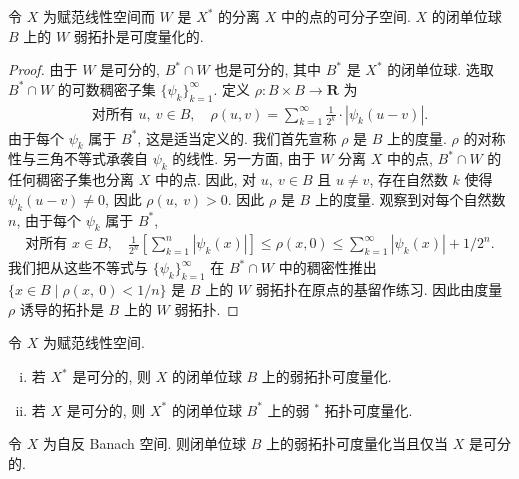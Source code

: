 \documentclass[../../main.tex]{subfiles}
\begin{document}
\begin{theorem}\label{theorem:ch15-W-metrizable}
令 $X$ 为赋范线性空间而 $W$ 是 $X^{*}$ 的分离 $X$ 中的点的可分子空间. $X$ 的闭单位球 $B$ 上的 $W$ 弱拓扑是可度量化的.
\end{theorem}

\begin{proof}
由于 $W$ 是可分的, $B^{*}\cap W$ 也是可分的, 其中 $B^{*}$ 是 $X^{*}$ 的闭单位球. 选取 $B^{*}\cap W$ 的可数稠密子集 $\{\psi_{k}\}_{k=1}^{\infty}$. 定义 $\rho:B\times B\to\mathbf{R}$ 为
\begin{align*}
\text{对所有 }u,\ v\in B,\quad\rho(u,v)=\sum_{k=1}^{\infty}\frac{1}{2^{k}}\cdot\left|\psi_{k}(u-v)\right|.
\end{align*}
由于每个 $\psi_{k}$ 属于 $B^{*}$, 这是适当定义的. 我们首先宣称 $\rho$ 是 $B$ 上的度量. $\rho$ 的对称性与三角不等式承袭自 $\psi_{k}$ 的线性. 另一方面, 由于 $W$ 分离 $X$ 中的点, $B^{*}\cap W$ 的任何稠密子集也分离 $X$ 中的点. 因此, 对 $u,\ v\in B$ 且 $u\neq v$, 存在自然数 $k$ 使得 $\psi_{k}(u-v)\neq 0$, 因此 $\rho(u,\ v)>0$. 因此 $\rho$ 是 $B$ 上的度量. 观察到对每个自然数 $n$, 由于每个 $\psi_{k}$ 属于 $B^{*}$,
\begin{align}
\text{对所有 }x\in B,\quad\frac{1}{2^{n}}\left[\sum_{k=1}^{n}\left|\psi_{k}(x)\right|\right]\leqslant\rho(x,0)\leqslant\sum_{k=1}^{\infty}\left|\psi_{k}(x)\right|+1/2^{n}.\label{align:ch15-W-metrizable}
\end{align}
我们把从这些不等式与 $\{\psi_{k}\}_{k=1}^{\infty}$ 在 $B^{*}\cap W$ 中的稠密性推出 $\{x\in B\mid\rho(x,\ 0)<1/n\}$ 是 $B$ 上的 $W$ 弱拓扑在原点的基留作练习. 因此由度量 $\rho$ 诱导的拓扑是 $B$ 上的 $W$ 弱拓扑.
\end{proof}

\begin{corollary}\label{corollary:ch15-metrizable}
令 $X$ 为赋范线性空间.
\begin{enumerate}[(i)]
\item 若 $X^{*}$ 是可分的, 则 $X$ 的闭单位球 $B$ 上的弱拓扑可度量化.
\item 若 $X$ 是可分的, 则 $X^{*}$ 的闭单位球 $B^{*}$ 上的弱 $^{*}$ 拓扑可度量化.
\end{enumerate}
\end{corollary}

\begin{theorem}\label{theorem:ch15-reflexive-metrizable}
令 $X$ 为自反 Banach 空间. 则闭单位球 $B$ 上的弱拓扑可度量化当且仅当 $X$ 是可分的.
\end{theorem}
\end{document}
